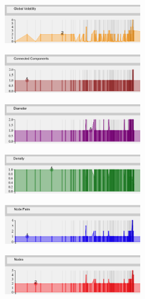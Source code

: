 \begin{multicols}{2}
\begin{center}
\includegraphics[trim={0 0 0 0}, width=60mm]{./Figures/margueriteGlobalVolatility.png}
\end{center}
\begin{center}
\includegraphics[trim={0 0 0 0}, width=60mm]{./Figures/margueriteConnectedComponents.png}
\end{center}
\begin{center}
\includegraphics[trim={0 0 0 0}, width=60mm]{./Figures/margueriteDiameter.png}
\end{center}
\begin{center}
\includegraphics[trim={0 0 0 0}, width=60mm]{./Figures/margueriteDensity.png}
\end{center}
\begin{center}
\includegraphics[trim={0 0 0 0}, width=60mm]{./Figures/margueriteNodePairs.png}
\end{center}
\begin{center}
\includegraphics[trim={0 0 0 0}, width=60mm]{./Figures/margueriteNodes.png}
\end{center}
\begin{center}

\end{center}
\end{multicols}
